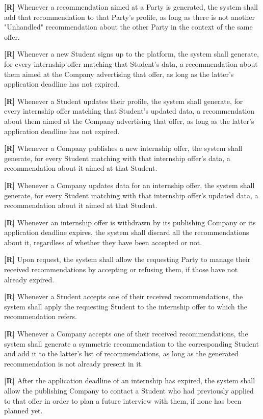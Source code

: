         \textbf{[R\creq]} Whenever a recommendation aimed at a Party is generated, the system shall add that recommendation to that Party's profile, as long as there is not another "Unhandled" recommendation about the other Party in the context of the same offer.

        \textbf{[R\creq]} Whenever a new Student signs up to the platform, the system shall generate, for every internship offer matching that Student's data, a recommendation about them aimed at the Company advertising that offer, as long as the latter's application deadline has not expired.

        \textbf{[R\creq]} Whenever a Student updates their profile, the system shall generate, for every internship offer matching that Student's updated data, a recommendation about them aimed at the Company advertising that offer, as long as the latter's application deadline has not expired.

        \textbf{[R\creq]} Whenever a Company publishes a new internship offer, the system shall generate, for every Student matching with that internship offer's data, a recommendation about it aimed at that Student.

        \textbf{[R\creq]} Whenever a Company updates data for an internship offer, the system shall generate, for every Student matching with that internship offer's updated data, a recommendation about it aimed at that Student.

        \textbf{[R\creq]} Whenever an internship offer is withdrawn by its publishing Company or its application deadline expires, the system shall discard all the recommendations about it, regardless of whether they have been accepted or not.

        \textbf{[R\creq]} Upon request, the system shall allow the requesting Party to manage their received recommendations by accepting or refusing them, if those have not already expired.

        \textbf{[R\creq]} Whenever a Student accepts one of their received recommendations, the system shall apply the requesting Student to the internship offer to which the recommendation refers.

        \textbf{[R\creq]} Whenever a Company accepts one of their received recommendations, the system shall generate a symmetric recommendation to the corresponding Student and add it to the latter's list of recommendations, as long as the generated recommendation is not already present in it.

        \textbf{[R\creq]} After the application deadline of an internship has expired, the system shall allow the publishing Company to contact a Student who had previously applied to that offer in order to plan a future interview with them, if none has been planned yet.

